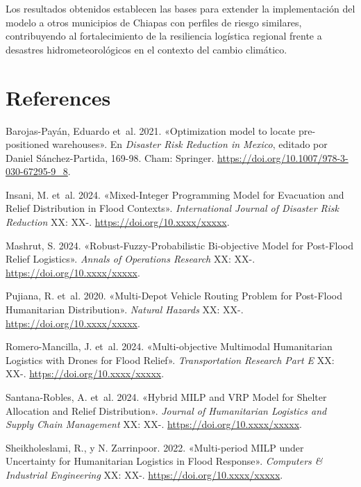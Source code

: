 \documentclass[
  spanish,
  us-letterpaper,
]{scrreprt}
\newlength{\cslhangindent}
\newenvironment{CSLReferences}[2] %
 {\begin{list}{}{%
  \setlength{\itemindent}{0pt}
  \setlength{\leftmargin}{0pt}
  \setlength{\parsep}{0pt}
  \ifodd #1
   \setlength{\leftmargin}{\cslhangindent}
   \setlength{\itemindent}{-1\cslhangindent}
  \fi
  \setlength{\itemsep}{#2\baselineskip}}}
 {\end{list}}
\numberwithin{equation}{chapter} %
\begin{document}
Los resultados obtenidos establecen las bases para extender la
implementación del modelo a otros municipios de Chiapas con perfiles de
riesgo similares, contribuyendo al fortalecimiento de la resiliencia
logística regional frente a desastres hidrometeorológicos en el contexto
del cambio climático.


\chapter*{References}\label{references}


\label{refs}
\begin{CSLReferences}{1}{0}
Barojas-Payán, Eduardo et~al. 2021. {«Optimization model to locate
pre-positioned warehouses»}. En \emph{Disaster Risk Reduction in
Mexico}, editado por Daniel Sánchez-Partida, 169-98. Cham: Springer.
\url{https://doi.org/10.1007/978-3-030-67295-9_8}.

Insani, M. et~al. 2024. {«Mixed-Integer Programming Model for Evacuation
and Relief Distribution in Flood Contexts»}. \emph{International Journal
of Disaster Risk Reduction} XX: XX-.
\url{https://doi.org/10.xxxx/xxxxx}.

Mashrut, S. 2024. {«Robust-Fuzzy-Probabilistic Bi-objective Model for
Post-Flood Relief Logistics»}. \emph{Annals of Operations Research} XX:
XX-. \url{https://doi.org/10.xxxx/xxxxx}.

Pujiana, R. et~al. 2020. {«Multi-Depot Vehicle Routing Problem for
Post-Flood Humanitarian Distribution»}. \emph{Natural Hazards} XX: XX-.
\url{https://doi.org/10.xxxx/xxxxx}.

Romero-Mancilla, J. et~al. 2024. {«Multi-objective Multimodal
Humanitarian Logistics with Drones for Flood Relief»}.
\emph{Transportation Research Part E} XX: XX-.
\url{https://doi.org/10.xxxx/xxxxx}.

Santana-Robles, A. et~al. 2024. {«Hybrid MILP and VRP Model for Shelter
Allocation and Relief Distribution»}. \emph{Journal of Humanitarian
Logistics and Supply Chain Management} XX: XX-.
\url{https://doi.org/10.xxxx/xxxxx}.

Sheikholeslami, R., y N. Zarrinpoor. 2022. {«Multi-period MILP under
Uncertainty for Humanitarian Logistics in Flood Response»}.
\emph{Computers \& Industrial Engineering} XX: XX-.
\url{https://doi.org/10.xxxx/xxxxx}.

\end{CSLReferences}
\end{document}
